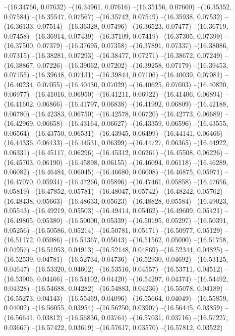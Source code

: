 --(16.34766, 0.07632)
--(16.34961, 0.07616)
--(16.35156, 0.07600)
--(16.35352, 0.07584)
--(16.35547, 0.07567)
--(16.35742, 0.07549)
--(16.35938, 0.07532)
--(16.36133, 0.07514)
--(16.36328, 0.07496)
--(16.36523, 0.07477)
--(16.36719, 0.07458)
--(16.36914, 0.07439)
--(16.37109, 0.07419)
--(16.37305, 0.07399)
--(16.37500, 0.07379)
--(16.37695, 0.07358)
--(16.37891, 0.07337)
--(16.38086, 0.07315)
--(16.38281, 0.07293)
--(16.38477, 0.07271)
--(16.38672, 0.07249)
--(16.38867, 0.07226)
--(16.39062, 0.07202)
--(16.39258, 0.07179)
--(16.39453, 0.07155)
--(16.39648, 0.07131)
--(16.39844, 0.07106)
--(16.40039, 0.07081)
--(16.40234, 0.07055)
--(16.40430, 0.07029)
--(16.40625, 0.07003)
--(16.40820, 0.06977)
--(16.41016, 0.06950)
--(16.41211, 0.06922)
--(16.41406, 0.06894)
--(16.41602, 0.06866)
--(16.41797, 0.06838)
--(16.41992, 0.06809)
--(16.42188, 0.06780)
--(16.42383, 0.06750)
--(16.42578, 0.06720)
--(16.42773, 0.06689)
--(16.42969, 0.06658)
--(16.43164, 0.06627)
--(16.43359, 0.06596)
--(16.43555, 0.06564)
--(16.43750, 0.06531)
--(16.43945, 0.06499)
--(16.44141, 0.06466)
--(16.44336, 0.06433)
--(16.44531, 0.06399)
--(16.44727, 0.06365)
--(16.44922, 0.06331)
--(16.45117, 0.06296)
--(16.45312, 0.06261)
--(16.45508, 0.06226)
--(16.45703, 0.06190)
--(16.45898, 0.06155)
--(16.46094, 0.06118)
--(16.46289, 0.06082)
--(16.46484, 0.06045)
--(16.46680, 0.06008)
--(16.46875, 0.05971)
--(16.47070, 0.05934)
--(16.47266, 0.05896)
--(16.47461, 0.05858)
--(16.47656, 0.05819)
--(16.47852, 0.05781)
--(16.48047, 0.05742)
--(16.48242, 0.05702)
--(16.48438, 0.05663)
--(16.48633, 0.05623)
--(16.48828, 0.05584)
--(16.49023, 0.05543)
--(16.49219, 0.05503)
--(16.49414, 0.05462)
--(16.49609, 0.05421)
--(16.49805, 0.05380)
--(16.50000, 0.05339)
--(16.50195, 0.05297)
--(16.50391, 0.05256)
--(16.50586, 0.05214)
--(16.50781, 0.05171)
--(16.50977, 0.05129)
--(16.51172, 0.05086)
--(16.51367, 0.05043)
--(16.51562, 0.05000)
--(16.51758, 0.04957)
--(16.51953, 0.04913)
--(16.52148, 0.04869)
--(16.52344, 0.04825)
--(16.52539, 0.04781)
--(16.52734, 0.04736)
--(16.52930, 0.04692)
--(16.53125, 0.04647)
--(16.53320, 0.04602)
--(16.53516, 0.04557)
--(16.53711, 0.04512)
--(16.53906, 0.04466)
--(16.54102, 0.04420)
--(16.54297, 0.04374)
--(16.54492, 0.04328)
--(16.54688, 0.04282)
--(16.54883, 0.04236)
--(16.55078, 0.04189)
--(16.55273, 0.04143)
--(16.55469, 0.04096)
--(16.55664, 0.04049)
--(16.55859, 0.04002)
--(16.56055, 0.03954)
--(16.56250, 0.03907)
--(16.56445, 0.03859)
--(16.56641, 0.03812)
--(16.56836, 0.03764)
--(16.57031, 0.03716)
--(16.57227, 0.03667)
--(16.57422, 0.03619)
--(16.57617, 0.03570)
--(16.57812, 0.03522)
